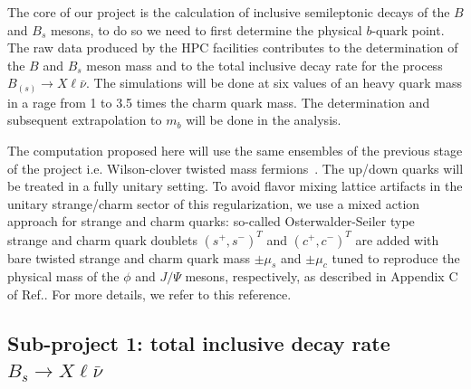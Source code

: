 \label{sec:proj}
The core of our project is the calculation of inclusive semileptonic decays of the $B$ and $B_s$ mesons, to do so we need to first determine the physical $b$-quark point.
The raw data produced by the HPC facilities
contributes to the determination of
the $B$ and $B_s$ meson mass and to
the total inclusive decay rate for the process $B_{(s)} \to X\ell\bar\nu$.
The simulations
will be done at six values of an heavy quark mass in a rage from 1 to 3.5 times the charm quark mass. The determination and subsequent extrapolation to $m_b$ will be done in the analysis.

The computation proposed here will use the same ensembles of the previous stage of the project
i.e. Wilson-clover twisted
mass fermions~\cite{Alexandrou:2018egz}. The up/down quarks will be treated
in a fully unitary setting. To avoid flavor mixing lattice artifacts
in the unitary strange/charm sector of this regularization, we use a
mixed action approach for strange and charm quarks: so-called
Osterwalder-Seiler type~\cite{Frezzotti:2004wz} strange and charm quark doublets
$(s^+ , s^-)^T$ and $(c^+ , c^- )^T$ are added with bare
twisted strange and charm quark mass $\pm \mu_s$ and $\pm \mu_c$
tuned to reproduce the physical mass of the $\phi$ and $J/\Psi$
mesons, respectively, as described in Appendix C of
Ref.\cite{ExtendedTwistedMass:2022jpw}. For more details, we refer to
this reference.





\subsection{Sub-project 1: total inclusive decay rate $B_s \to X\ell\bar\nu$}


